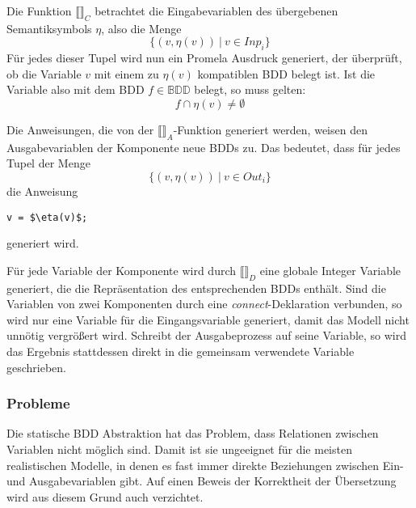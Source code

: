 Die Funktion $\llbracket\rrbracket_C$ betrachtet die Eingabevariablen des übergebenen Semantiksymbols $\eta$, also die Menge
\[ \{ (v,\eta(v))\ |\ v\in \mathit{Inp}_i \} \]
Für jedes dieser Tupel wird nun ein Promela Ausdruck generiert, der überprüft, ob die Variable $v$ mit einem zu $\eta(v)$ kompatiblen BDD belegt ist.
Ist die Variable also mit dem BDD $f\in\mathbb{BDD}$ belegt, so muss gelten:
\[ f\cap\eta(v)\neq\emptyset \]

Die Anweisungen, die von der $\llbracket\rrbracket_A$-Funktion generiert werden, weisen den Ausgabevariablen der Komponente neue BDDs zu.
Das bedeutet, dass für jedes Tupel der Menge
\[ \{ (v,\eta(v))\ |\ v\in \mathit{Out}_i \} \]
die Anweisung
\begin{lstlisting}[language=promela,mathescape=true]
  v = $\eta(v)$;
\end{lstlisting}
generiert wird.

Für jede Variable der Komponente wird durch $\llbracket\rrbracket_D$ eine globale Integer Variable generiert, die die Repräsentation des entsprechenden BDDs enthält.
Sind die Variablen von zwei Komponenten durch eine \emph{connect}-Deklaration verbunden, so wird nur eine Variable für die Eingangsvariable generiert, damit das Modell nicht unnötig vergrößert wird.
Schreibt der Ausgabeprozess auf seine Variable, so wird das Ergebnis stattdessen direkt in die gemeinsam verwendete Variable geschrieben.
\subsubsection{Probleme}
Die statische BDD Abstraktion hat das Problem, dass Relationen zwischen Variablen nicht möglich sind.
Damit ist sie ungeeignet für die meisten realistischen Modelle, in denen es fast immer direkte Beziehungen zwischen Ein- und Ausgabevariablen gibt.
Auf einen Beweis der Korrektheit der Übersetzung wird aus diesem Grund auch verzichtet.